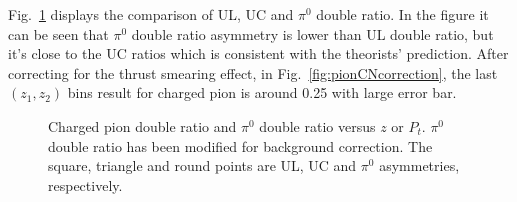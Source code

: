 \fi
Fig.~\ref{fig:pionCN} displays the comparison of UL, UC and $\pi^0$ double ratio. In the figure it can be seen that $\pi^0$ double ratio asymmetry is lower than UL double ratio, but it's close to the UC ratios which is consistent with the theorists' prediction. After correcting for the thrust smearing effect, in Fig.~\ref{fig:pionCNcorrection}, the last $(z_1,z_2)$ bins result for charged pion is around 0.25 with large error bar. 
\begin{figure}[H]
  \centering     
  \caption{Charged pion double ratio and $\pi^0$ double ratio versus $z$ or $P_t$. $\pi^0$ double ratio has been modified for background correction. The square, triangle and round points are UL, UC and $\pi^0$ asymmetries, respectively.}
\label{fig:pionCN}
\end{figure}

